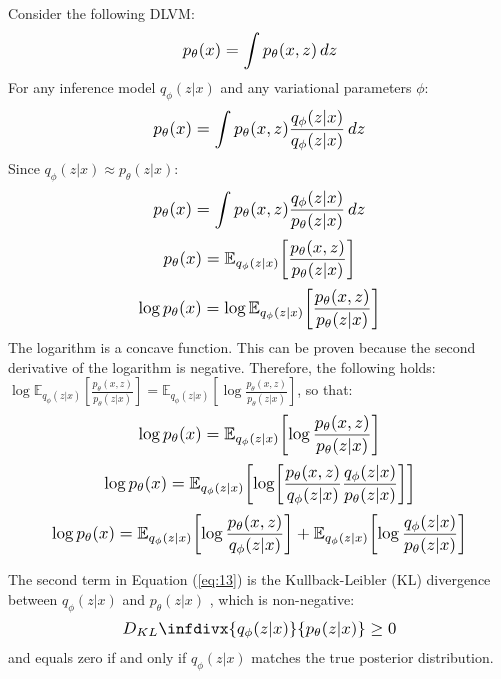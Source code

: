 \documentclass{article}
\newcommand{\infdiv}{D_{KL}\infdivx}
\newcommand*{\Scale}[2][4]{\scalebox{#1}{\ensuremath{#2}}}
\begin{document}
Consider the following DLVM:
\begin{equation}
\Scale[1.2]{ \displaystyle p_\theta(x) = \int p_\theta(x,z) \,dz }
\end{equation}
For any inference model $ q_\phi(z|x) $ and any variational parameters $ \phi $:
\begin{equation}
\Scale[1.2]{ \displaystyle p_\theta(x) = \int p_\theta(x,z) \frac{q_\phi(z|x)}{q_\phi(z|x)} \,dz }
\end{equation}
Since $ q_\phi(z|x) \approx p_\theta(z|x) $:
\begin{equation}
\Scale[1.2]{ \displaystyle p_\theta(x) = \int p_\theta(x,z) \frac{q_\phi(z|x)}{p_\theta(z|x)} \,dz }
\end{equation}
\begin{equation}
\Scale[1.2]{ \displaystyle p_\theta(x) = \mathbb{E}_{q_\phi(z|x)} \left[ \frac{p_\theta(x,z)}{p_\theta(z|x)} \right] }
\end{equation}
\begin{equation}
\Scale[1.2]{\displaystyle \log p_\theta(x) = \log \mathbb{E}_{q_\phi(z|x)} \left[ \frac{p_\theta(x,z)}{p_\theta(z|x)} \right] }
\end{equation}
The logarithm is a concave function. This can be proven because the second derivative of the logarithm is negative. Therefore, the following holds: $ \log \mathbb{E}_{q_\phi(z|x)} \left[ \frac{p_\theta(x,z)}{p_\theta(z|x)} \right] = \mathbb{E}_{q_\phi(z|x)} \left[ \log \frac{p_\theta(x,z)}{p_\theta(z|x)} \right] $, so that:
\begin{equation}
\Scale[1.2]{\displaystyle \log p_\theta(x) = \mathbb{E}_{q_\phi(z|x)} \left[ \log \frac{p_\theta(x,z)}{p_\theta(z|x)} \right] }
\end{equation}
\begin{equation}
\Scale[1.2]{\displaystyle \log p_\theta(x) = \mathbb{E}_{q_\phi(z|x)} 
\left[ \log \left[ \frac{p_\theta(x,z)}{q_\phi(z|x)} \frac{q_\phi(z|x)}{p_\theta(z|x)} \right] \right] }
\end{equation}
\begin{equation} \label{eq:13}
\Scale[1.2]{\displaystyle \log p_\theta(x) = 
\mathbb{E}_{q_\phi(z|x)} \left[ \log \frac{p_\theta(x,z)}{q_\phi(z|x)} \right]
+
\mathbb{E}_{q_\phi(z|x)} \left[ \log \frac{q_\phi(z|x)}{p_\theta(z|x)} \right]
}
\end{equation}

The second term in Equation (\ref{eq:13}) is the Kullback-Leibler (KL) divergence between $ q_\phi(z|x) $ and $ p_\theta(z|x) $ , which is non-negative:
\begin{equation}
\Scale[1.2]{ \displaystyle \infdiv{q_\phi(z|x)}{p_\theta(z|x)} \geq 0 }
\end{equation}
and equals zero if and only if $ q_\phi(z|x) $ matches the true posterior distribution.
\\
\end{document}
